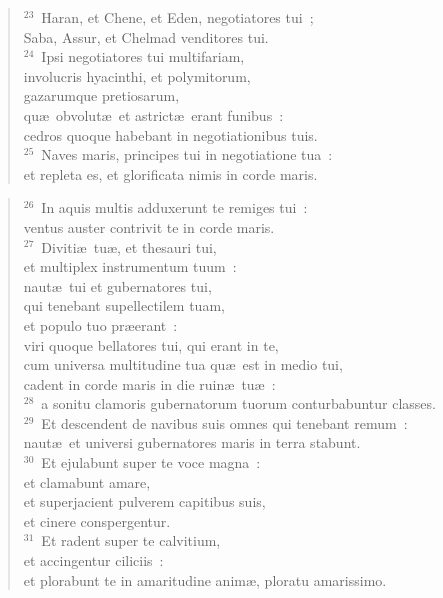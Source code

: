 \begin{verse}
${}^{23}$~Haran, et Chene, et Eden, negotiatores tui~;\\ Saba, Assur, et Chelmad venditores tui.\\
${}^{24}$~Ipsi negotiatores tui multifariam,\\ involucris hyacinthi, et polymitorum,\\ gazarumque pretiosarum,\\ qu\ae\ obvolut\ae\ et astrict\ae\ erant funibus~:\\ cedros quoque habebant in negotiationibus tuis.\\
${}^{25}$~Naves maris, principes tui in negotiatione tua~:\\ et repleta es, et glorificata nimis in corde maris.\end{verse}


\begin{verse}${}^{26}$~In aquis multis adduxerunt te remiges tui~:\\ ventus auster contrivit te in corde maris.\\
${}^{27}$~Diviti\ae\ tu\ae , et thesauri tui,\\ et multiplex instrumentum tuum~:\\ naut\ae\ tui et gubernatores tui,\\ qui tenebant supellectilem tuam,\\ et populo tuo pr\ae erant~:\\ viri quoque bellatores tui, qui erant in te,\\ cum universa multitudine tua qu\ae\ est in medio tui,\\ cadent in corde maris in die ruin\ae\ tu\ae~:\\
${}^{28}$~a sonitu clamoris gubernatorum tuorum conturbabuntur classes.\\
${}^{29}$~Et descendent de navibus suis omnes qui tenebant remum~:\\ naut\ae\ et universi gubernatores maris in terra stabunt.\\
${}^{30}$~Et ejulabunt super te voce magna~:\\ et clamabunt amare,\\ et superjacient pulverem capitibus suis,\\ et cinere conspergentur.\\
${}^{31}$~Et radent super te calvitium,\\ et accingentur ciliciis~:\\ et plorabunt te in amaritudine anim\ae , ploratu amarissimo.\\

\end{verse}
